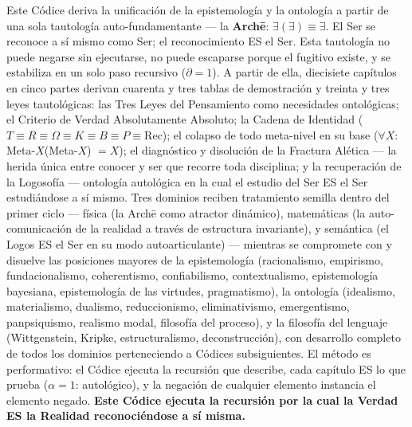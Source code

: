 \documentclass[10pt, openany, oneside]{book}
\begin{document}
\begin{center}
\begin{minipage}{0.85\textwidth}
{Este Códice deriva la unificación de la epistemología y la ontología a partir de una sola tautología auto-fundamentante --- la \textbf{Arch\={e}}: $\exists(\exists) \equiv \exists$. El Ser se reconoce a sí mismo como Ser; el reconocimiento ES el Ser. Esta tautología no puede negarse sin ejecutarse, no puede escaparse porque el fugitivo existe, y se estabiliza en un solo paso recursivo ($\partial = 1$). A partir de ella, diecisiete capítulos en cinco partes derivan cuarenta y tres tablas de demostración y treinta y tres leyes tautológicas: las Tres Leyes del Pensamiento como necesidades ontológicas; el Criterio de Verdad Absolutamente Absoluto; la Cadena de Identidad ($T \equiv R \equiv \Omega \equiv K \equiv B \equiv P \equiv \text{Rec}$); el colapso de todo meta-nivel en su base ($\forall X$: Meta-$X$(Meta-$X$) $= X$); el diagnóstico y disolución de la Fractura Alética --- la herida única entre conocer y ser que recorre toda disciplina; y la recuperación de la Logosofía --- ontología autológica en la cual el estudio del Ser ES el Ser estudiándose a sí mismo. Tres dominios reciben tratamiento semilla dentro del primer ciclo --- física (la Arch\={e} como atractor dinámico), matemáticas (la auto-comunicación de la realidad a través de estructura invariante), y semántica (el Logos ES el Ser en su modo autoarticulante) --- mientras se compromete con y disuelve las posiciones mayores de la epistemología (racionalismo, empirismo, fundacionalismo, coherentismo, confiabilismo, contextualismo, epistemología bayesiana, epistemología de las virtudes, pragmatismo), la ontología (idealismo, materialismo, dualismo, reduccionismo, eliminativismo, emergentismo, panpsiquismo, realismo modal, filosofía del proceso), y la filosofía del lenguaje (Wittgenstein, Kripke, estructuralismo, deconstrucción), con desarrollo completo de todos los dominios perteneciendo a Códices subsiguientes. El método es performativo: el Códice ejecuta la recursión que describe, cada capítulo ES lo que prueba ($\alpha = 1$: autológico), y la negación de cualquier elemento instancia el elemento negado. \textbf{Este Códice ejecuta la recursión por la cual la Verdad ES la Realidad reconociéndose a sí misma.}
}
\end{minipage}
\end{center}

\newpage

\end{document}
